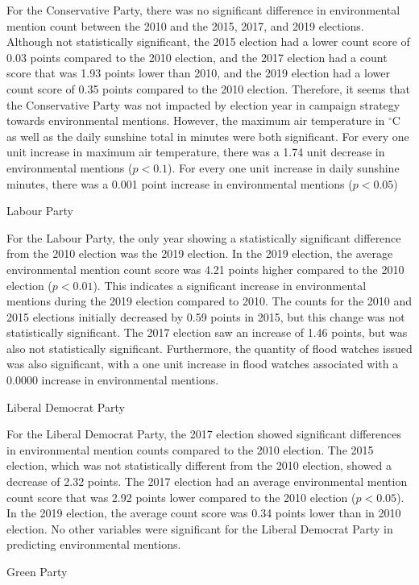 \documentclass[12pt,letterpaper]{article}
\begin{document}
For the Conservative Party, there was no significant difference in environmental mention count between the 2010 and the 2015, 2017, and 2019 elections. Although not statistically significant, the 2015 election had a lower count score of 0.03 points compared to the 2010 election, and the 2017 election had a count score that was 1.93 points lower than 2010, and the 2019 election had a lower count score of 0.35 points compared to the 2010 election. Therefore, it seems that the Conservative Party was not impacted by election year in campaign strategy towards environmental mentions. However, the maximum air temperature in $^\circ$C as well as the daily sunshine total in minutes were both significant. For every one unit increase in maximum air temperature, there was a 1.74 unit decrease in environmental mentions ($p<0.1$). For every one unit increase in daily sunshine minutes, there was a 0.001 point increase in environmental mentions ($p<0.05$)

Labour Party

For the Labour Party, the only year showing a statistically significant difference from the 2010 election was the 2019 election. In the 2019 election, the average environmental mention count score was 4.21 points higher compared to the 2010 election ($p<0.01$). This indicates a significant increase in environmental mentions during the 2019 election compared to 2010. The counts for the 2010 and 2015 elections initially decreased by 0.59 points in 2015, but this change was not statistically significant. The 2017 election saw an increase of 1.46 points, but was also not statistically significant. Furthermore, the quantity of flood watches issued was also significant, with a one unit increase in flood watches associated with a 0.0000 increase in environmental mentions.

Liberal Democrat Party

For the Liberal Democrat Party, the 2017 election showed significant differences in environmental mention counts compared to the 2010 election. The 2015 election, which was not statistically different from the 2010 election, showed a decrease of 2.32 points. The 2017 election had an average environmental mention count score that was 2.92 points lower compared to the 2010 election ($p<0.05$). In the 2019 election, the average count score was 0.34 points lower than in 2010 election. No other variables were significant for the Liberal Democrat Party in predicting environmental mentions.

Green Party
\end{document}
